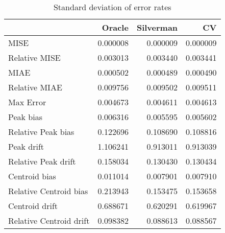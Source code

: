 \begin{table}[ht]
\centering
\begin{tabular}{lrrr}
  \hline
 & Oracle & Silverman & CV \\ 
  \hline
MISE & 0.000008 & 0.000009 & 0.000009 \\ 
  Relative MISE & 0.003013 & 0.003440 & 0.003441 \\ 
  MIAE & 0.000502 & 0.000489 & 0.000490 \\ 
  Relative MIAE & 0.009756 & 0.009502 & 0.009511 \\ 
  Max Error & 0.004673 & 0.004611 & 0.004613 \\ 
  Peak bias & 0.006316 & 0.005595 & 0.005602 \\ 
  Relative Peak bias & 0.122696 & 0.108690 & 0.108816 \\ 
  Peak drift & 1.106241 & 0.913011 & 0.913039 \\ 
  Relative Peak drift & 0.158034 & 0.130430 & 0.130434 \\ 
  Centroid bias & 0.011014 & 0.007901 & 0.007910 \\ 
  Relative Centroid bias & 0.213943 & 0.153475 & 0.153658 \\ 
  Centroid drift & 0.688671 & 0.620291 & 0.619967 \\ 
  Relative Centroid drift & 0.098382 & 0.088613 & 0.088567 \\ 
   \hline
\end{tabular}
\caption{Standard deviation of error rates} 
\label{tbl:stddev_error_rates}
\end{table}
